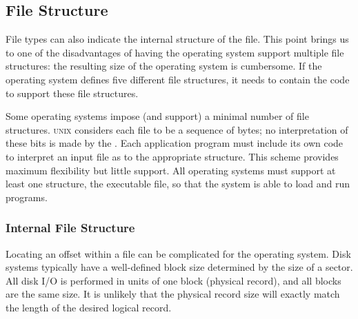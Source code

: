 \subsection{File Structure}\label{subsec:File_Structure}
File types can also indicate the internal structure of the file.
This point brings us to one of the disadvantages of having the operating system support multiple file structures: the resulting size of the operating system is cumbersome.
If the operating system defines five different file structures, it needs to contain the code to support these file structures.

Some operating systems impose (and support) a minimal number of file structures.
\textsc{unix} considers each file to be a sequence of bytes; no interpretation of these bits is made by the \textbf{}.
Each application program must include its own code to interpret an input file as to the appropriate structure.
This scheme provides maximum flexibility but little support.
All operating systems must support at least one structure, the executable file, so that the system is able to load and run programs.

\subsubsection{Internal File Structure}\label{subsubsec:Internal_File_Structure}
Locating an offset within a file can be complicated for the operating system.
Disk systems typically have a well-defined block size determined by the size of a sector.
All disk I/O is performed in units of one block (physical record), and all blocks are the same size.
It is unlikely that the physical record size will exactly match the length of the desired logical record.


